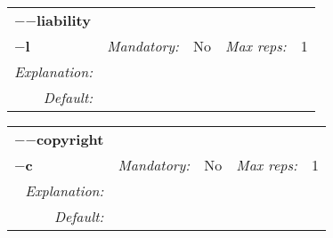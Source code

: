 \begin{center}\begin{tabular}{|rr|rl|rl|}
\hline
\multicolumn{2}{|l|}{\textbf{$-$$-$liability}} & \multicolumn{4}{|l|}{} \\
\cline{3-6}
\multicolumn{2}{|l|}{\textbf{$-$l}} & \emph{Mandatory:} & No & \emph{Max reps:} & 1 \\
\hline
\emph{Explanation:} & \multicolumn{5}{|p{12cm}|}{} \\
\hline
\emph{Default:} & \multicolumn{5}{|p{12cm}|}{} \\
\hline
\end{tabular}\end{center}
\begin{center}\begin{tabular}{|rr|rl|rl|}
\hline
\multicolumn{2}{|l|}{\textbf{$-$$-$copyright}} & \multicolumn{4}{|l|}{} \\
\cline{3-6}
\multicolumn{2}{|l|}{\textbf{$-$c}} & \emph{Mandatory:} & No & \emph{Max reps:} & 1 \\
\hline
\emph{Explanation:} & \multicolumn{5}{|p{12cm}|}{} \\
\hline
\emph{Default:} & \multicolumn{5}{|p{12cm}|}{} \\
\hline
\end{tabular}\end{center}
